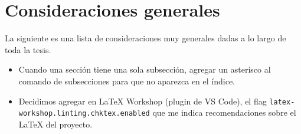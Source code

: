 \section*{Consideraciones generales}

La siguiente es una lista de consideraciones muy generales dadas a lo largo de toda la tesis.
\begin{itemize}
    \item Cuando una sección tiene una sola subsección, agregar un asterísco al comando de subsecciones para que no aparezca en el índice.
    \item Decidimos agregar en LaTeX Workshop (plugin de VS Code), el flag \texttt{latex-workshop.linting.chktex.enabled} que me indica recomendaciones sobre el LaTeX del proyecto.
\end{itemize}

